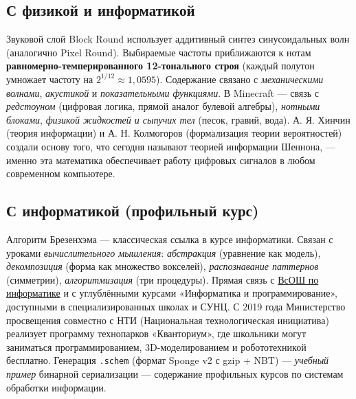 \documentclass[12pt,a4paper]{scrartcl}
\newcommand{\acc}[1]{\textcolor{accent}{\textbf{#1}}}
\begin{document}
\subsection{С физикой и информатикой}
Звуковой слой Block Round использует аддитивный синтез синусоидальных волн (аналогично Pixel Round). Выбираемые частоты приближаются к нотам \acc{равномерно-темперированного 12-тонального строя} (каждый полутон умножает частоту на $2^{1/12} \approx 1{,}0595$). Содержание связано с \emph{механическими волнами}, \emph{акустикой} и \emph{показательными функциями}. В Minecraft --- связь с \emph{редстоуном} (цифровая логика, прямой аналог булевой алгебры), \emph{нотными блоками}, \emph{физикой жидкостей и сыпучих тел} (песок, гравий, вода). А. Я. Хинчин (теория информации) и А. Н. Колмогоров (формализация теории вероятностей) создали основу того, что сегодня называют теорией информации Шеннона, --- именно эта математика обеспечивает работу цифровых сигналов в любом современном компьютере.

\subsection{С информатикой (профильный курс)}
Алгоритм Брезенхэма --- классическая ссылка в курсе информатики. Связан с уроками \emph{вычислительного мышления}: \emph{абстракция} (уравнение как модель), \emph{декомпозиция} (форма как множество вокселей), \emph{распознавание паттернов} (симметрии), \emph{алгоритмизация} (три процедуры). Прямая связь с \hyperref[sec:olimp]{ВсОШ по информатике} и с углублёнными курсами «Информатика и программирование», доступными в специализированных школах и СУНЦ. С 2019 года Министерство просвещения совместно с НТИ (Национальная технологическая инициатива) реализует программу технопарков «Кванториум», где школьники могут заниматься программированием, 3D-моделированием и робототехникой бесплатно. Генерация \texttt{.schem} (формат Sponge v2 с gzip + NBT) --- \emph{учебный пример} бинарной сериализации --- содержание профильных курсов по системам обработки информации.
\end{document}
